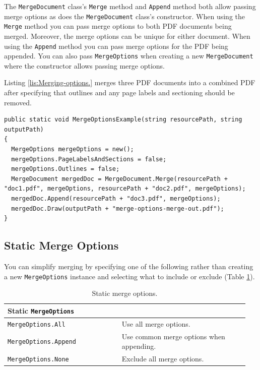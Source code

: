 \documentclass[american]{tufte-book}
\providecommand{\tabularnewline}{\\}
\numberwithin{equation}{section}
\numberwithin{figure}{section}
\begin{document}
{{\begin{table}
\end{table}

\medskip{}
The \texttt{MergeDocument} class's \texttt{Merge} method and \texttt{Append}
method both allow passing merge options as does the \texttt{MergeDocument}
class's constructor. When using the \texttt{Merge} method you can
pass merge options to both PDF documents being merged. Moreover, the
merge options can be unique for either document. When using the \texttt{Append}
method you can pass merge options for the PDF being appended. You
can also pass \texttt{MergeOptions} when creating a new \texttt{MergeDocument}
where the constructor allows passing merge options.

Listing \ref{lis:Merging-options.} merges three PDF documents into
a combined PDF after specifying that outlines and any page labels
and sectioning should be removed.

\bgroup{}
\begin{lstlisting}[caption={Merging options.},label={lis:Merging-options.},basicstyle={\footnotesize\ttfamily},breaklines=true]
public static void MergeOptionsExample(string resourcePath, string outputPath)
{
  MergeOptions mergeOptions = new();
  mergeOptions.PageLabelsAndSections = false;
  mergeOptions.Outlines = false;
  MergeDocument mergedDoc = MergeDocument.Merge(resourcePath + "doc1.pdf", mergeOptions, resourcePath + "doc2.pdf", mergeOptions);
  mergedDoc.Append(resourcePath + "doc3.pdf", mergeOptions);
  mergedDoc.Draw(outputPath + "merge-options-merge-out.pdf");
}
\end{lstlisting}
\leavevmode\egroup
\subsection{Static Merge Options}

You can simplify merging by specifying one of the following rather
than creating a new \texttt{MergeOptions} instance and selecting what
to include or exclude (Table \ref{tab:Static-merge-options.}).

\begin{table}
\begin{tabular}{p{0.45\linewidth}p{0.5\linewidth}}
\toprule 
{\small Static }{\small\texttt{MergeOptions}} & \tabularnewline
\midrule
{\small\texttt{MergeOptions.All}} & {\small Use all merge options.}\tabularnewline
{\small\texttt{MergeOptions.Append}} & {\small Use common merge options when appending.}\tabularnewline
{\small\texttt{MergeOptions.None}} & {\small Exclude all merge options.}\tabularnewline
\bottomrule
\end{tabular}\caption{Static merge options.}\label{tab:Static-merge-options.}


\end{table}}}
\end{document}

